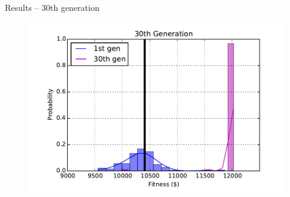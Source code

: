 \documentclass[12pt,portuguese]{beamer}
\begin{document}
\begin{frame}{Results -- 30th generation}
	\begin{figure}[h]
	\centering
	\includegraphics[width=0.9\columnwidth]{images/30l_100.pdf}
	\end{figure}
\end{frame}
%
%
%
%
%
%
%
%
%
%
%
%
%
%
\end{document}

